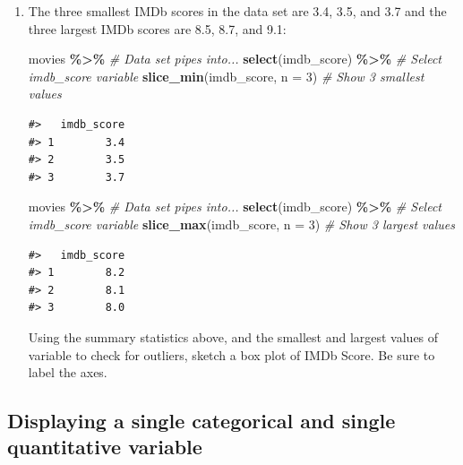 \documentclass[
]{report}
\newenvironment{Shaded}{\begin{snugshade}}{\end{snugshade}}
\newcommand{\CommentTok}[1]{\textcolor[rgb]{0.56,0.35,0.01}{\textit{#1}}}
\newcommand{\DataTypeTok}[1]{\textcolor[rgb]{0.13,0.29,0.53}{#1}}
\newcommand{\DecValTok}[1]{\textcolor[rgb]{0.00,0.00,0.81}{#1}}
\newcommand{\KeywordTok}[1]{\textcolor[rgb]{0.13,0.29,0.53}{\textbf{#1}}}
\newcommand{\NormalTok}[1]{#1}
\newcommand{\OperatorTok}[1]{\textcolor[rgb]{0.81,0.36,0.00}{\textbf{#1}}}
\newcommand{\StringTok}[1]{\textcolor[rgb]{0.31,0.60,0.02}{#1}}
\begin{document}
\begin{enumerate}
\def\labelenumi{\arabic{enumi}.}
\setcounter{enumi}{10}
\item
  The three smallest IMDb scores in the data set are 3.4, 3.5, and 3.7 and the three largest IMDb scores are 8.5, 8.7, and 9.1:

\begin{Shaded}
\begin{Highlighting}[]
\NormalTok{movies }\OperatorTok{\%\textgreater{}\%}\StringTok{ }\CommentTok{\# Data set pipes into...}
\StringTok{  }\KeywordTok{select}\NormalTok{(imdb\_score) }\OperatorTok{\%\textgreater{}\%}\StringTok{ }\CommentTok{\# Select imdb\_score variable}
\StringTok{  }\KeywordTok{slice\_min}\NormalTok{(imdb\_score, }\DataTypeTok{n =} \DecValTok{3}\NormalTok{)  }\CommentTok{\# Show 3 smallest values}
\end{Highlighting}
\end{Shaded}

\begin{verbatim}
#>   imdb_score
#> 1        3.4
#> 2        3.5
#> 3        3.7
\end{verbatim}

  \newpage

\begin{Shaded}
\begin{Highlighting}[]
\NormalTok{movies }\OperatorTok{\%\textgreater{}\%}\StringTok{ }\CommentTok{\# Data set pipes into...}
\StringTok{  }\KeywordTok{select}\NormalTok{(imdb\_score) }\OperatorTok{\%\textgreater{}\%}\StringTok{ }\CommentTok{\# Select imdb\_score variable}
\StringTok{  }\KeywordTok{slice\_max}\NormalTok{(imdb\_score, }\DataTypeTok{n =} \DecValTok{3}\NormalTok{)  }\CommentTok{\# Show 3 largest values}
\end{Highlighting}
\end{Shaded}

\begin{verbatim}
#>   imdb_score
#> 1        8.2
#> 2        8.1
#> 3        8.0
\end{verbatim}

  Using the summary statistics above, and the smallest and largest values of variable to check for outliers, sketch a box plot of IMDb Score. Be sure to label the axes.
\end{enumerate}

\vspace{1.5in}

\hypertarget{displaying-a-single-categorical-and-single-quantitative-variable}{%
\subsection{Displaying a single categorical and single quantitative variable}\label{displaying-a-single-categorical-and-single-quantitative-variable}}
\end{document}
